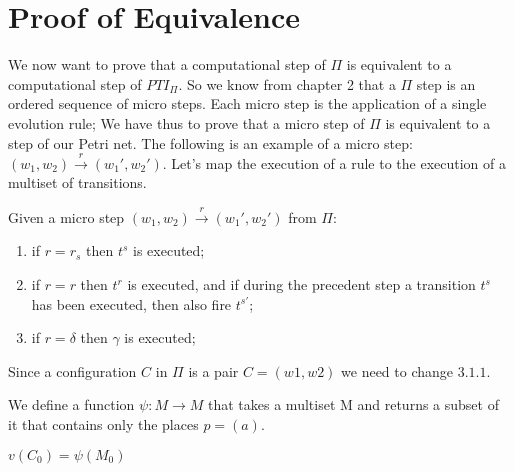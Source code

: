 \chapter{Proof of Equivalence}

We now want to prove that a computational step of $\Pi$ is equivalent to a computational step of $PTI_\Pi$.
So we know from chapter 2 that a $\Pi$ step is an ordered sequence of micro steps.
Each micro step is the application of a single evolution rule;
We have thus to prove that a micro step of $\Pi$ is equivalent to a step of our Petri net.
The following is an example of a micro step: $(w_1,w_2) \xrightarrow{r} (w_1',w_2')$.
Let's map the execution of a rule to the execution of a multiset of transitions.

\begin{definition}
    Given a micro step $(w_1,w_2) \xrightarrow{r} (w_1',w_2')$ from $\Pi$:
    \begin{enumerate}
        \item if $r=r_s$ then $t^s$ is executed;
        \item if $r=r$ then $t^r$ is executed, and if during the precedent step a transition $t^s$ has been executed, then also fire $t^{s'}$;
        \item if $r=\delta$ then $\gamma$ is executed;
    \end{enumerate}
\end{definition}

Since a configuration $C$ in $\Pi$ is a pair $C=(w1,w2)$ we need to change \hyperref[def:map_conf]{$3.1.1$}.

\begin{definition}
We define a function $\psi: M \rightarrow M$ that takes a multiset M and returns a subset of it 
that contains only the places $p=(a)$.
\end{definition}

\begin{fact}[]
$v(C_0)=\psi(M_{0})$
\end{fact}
